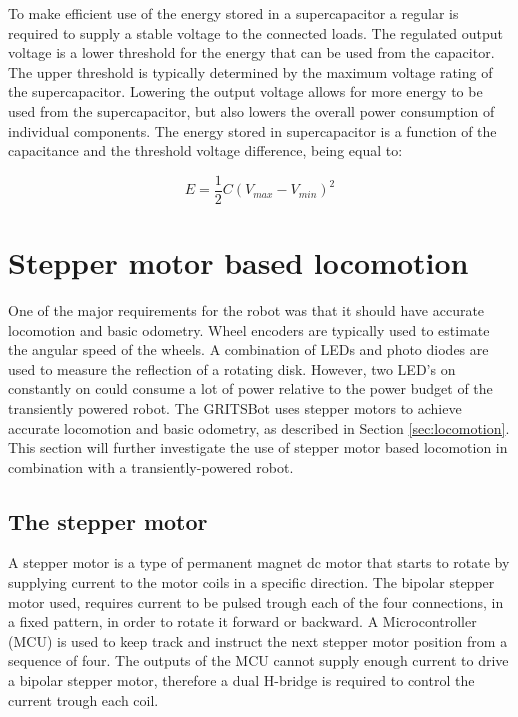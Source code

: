 To make efficient use of the energy stored in a supercapacitor a regular is required to supply a stable voltage to the connected loads.
The regulated output voltage is a lower threshold for the energy that can be used from the capacitor.
The upper threshold is typically determined by the maximum voltage rating of the supercapacitor.
Lowering the output voltage allows for more energy to be used from the supercapacitor, but also lowers the overall power consumption of individual components.
The energy stored in supercapacitor is a function of the capacitance and the threshold voltage difference, being equal to:

\begin{equation}
\label{eq:cap2}
E = \frac{1}{2}C(V_{max} - V_{min})^{2}
\end{equation}

\section{Stepper motor based locomotion}

One of the major requirements for the robot was that it should have accurate locomotion and basic odometry.
Wheel encoders are typically used to estimate the angular speed of the wheels.
A combination of LEDs and photo diodes are used to measure the reflection of a rotating disk.
However, two LED's on constantly on could consume a lot of power relative to the power budget of the transiently powered robot.
The GRITSBot uses stepper motors to achieve accurate locomotion and basic odometry, as described in Section \ref{sec:locomotion}.
This section will further investigate the use of stepper motor based locomotion in combination with a transiently-powered robot.

\subsection{The stepper motor}
A stepper motor is a type of permanent magnet dc motor that starts to rotate by supplying current to the motor coils in a specific direction.
The bipolar stepper motor used, requires current to be pulsed trough each of the four connections, in a fixed pattern, in order to rotate it forward or backward.
A Microcontroller (MCU) is used to keep track and instruct the next stepper motor position from a sequence of four.
The outputs of the MCU cannot supply enough current to drive a bipolar stepper motor, therefore a dual H-bridge is required to control the current trough each coil.

